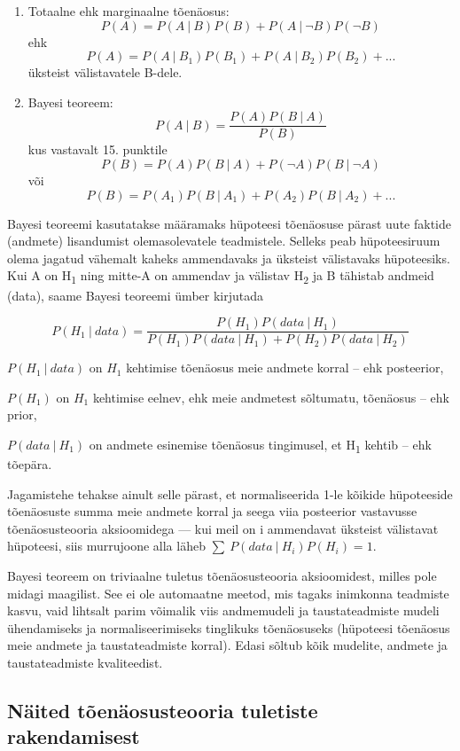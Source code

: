 \documentclass[]{book}
\begin{document}
\begin{enumerate}
\item
  Totaalne ehk marginaalne tõenäosus:
  \[P(A) = P(A~\vert~B)P(B) + P(A~\vert~\lnot B)P(\lnot B)\] ehk
  \[P(A) = P(A~\vert~B_1)P(B_1) + P(A~\vert~ B_2)P(B_2) + ...\] üksteist
  välistavatele B-dele.
\item
  Bayesi teoreem: \[P(A~\vert~B) =\frac{P(A)P(B~\vert~A)}{P(B)}\] kus
  vastavalt 15. punktile
  \[P(B) = P(A)P(B~\vert~A) + P(\lnot A)P(B~\vert~\lnot A)\] või
  \[P(B) = P(A_1)P(B~\vert~A_1) + P(A_2)P(B~\vert~A_2) + ...\]
\end{enumerate}

Bayesi teoreemi kasutatakse määramaks hüpoteesi tõenäosuse pärast uute
faktide (andmete) lisandumist olemasolevatele teadmistele. Selleks peab
hüpoteesiruum olema jagatud vähemalt kaheks ammendavaks ja üksteist
välistavaks hüpoteesiks. Kui A on H\textsubscript{1} ning mitte-A on
ammendav ja välistav H\textsubscript{2} ja B tähistab andmeid (data),
saame Bayesi teoreemi ümber kirjutada

\[P(H_1~\vert~data) =  \frac{P(H_1)P(data~\vert~H_1)}{ P(H_1)P(data~\vert~H_1) + P(H_2)P(data~ \vert ~H_2)}\]

\(P(H_1~\vert~data)\) on \(H_1\) kehtimise tõenäosus meie andmete korral
-- ehk posteerior,

\(P(H_1)\) on \(H_1\) kehtimise eelnev, ehk meie andmetest sõltumatu,
tõenäosus -- ehk prior,

\(P(data~\vert~H_1)\) on andmete esinemise tõenäosus tingimusel, et
H\textsubscript{1} kehtib -- ehk tõepära.

Jagamistehe tehakse ainult selle pärast, et normaliseerida 1-le kõikide
hüpoteeside tõenäosuste summa meie andmete korral ja seega viia
posteerior vastavusse tõenäosusteooria aksioomidega --- kui meil on i
ammendavat üksteist välistavat hüpoteesi, siis murrujoone alla läheb
\(\sum~P(data~\vert~H_i)P(H_i) = 1\).

Bayesi teoreem on triviaalne tuletus tõenäosusteooria aksioomidest,
milles pole midagi maagilist. See ei ole automaatne meetod, mis tagaks
inimkonna teadmiste kasvu, vaid lihtsalt parim võimalik viis andmemudeli
ja taustateadmiste mudeli ühendamiseks ja normaliseerimiseks tinglikuks
tõenäosuseks (hüpoteesi tõenäosus meie andmete ja taustateadmiste
korral). Edasi sõltub kõik mudelite, andmete ja taustateadmiste
kvaliteedist.

\subsection*{Näited tõenäosusteooria tuletiste
rakendamisest}\label{naited-toenaosusteooria-tuletiste-rakendamisest}
\end{document}
